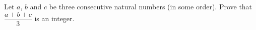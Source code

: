 Let $a$, $b$ and $c$ be three consecutive natural numbers (in some order). Prove that $\dfrac{a+b+c}{3}$ is an integer.

